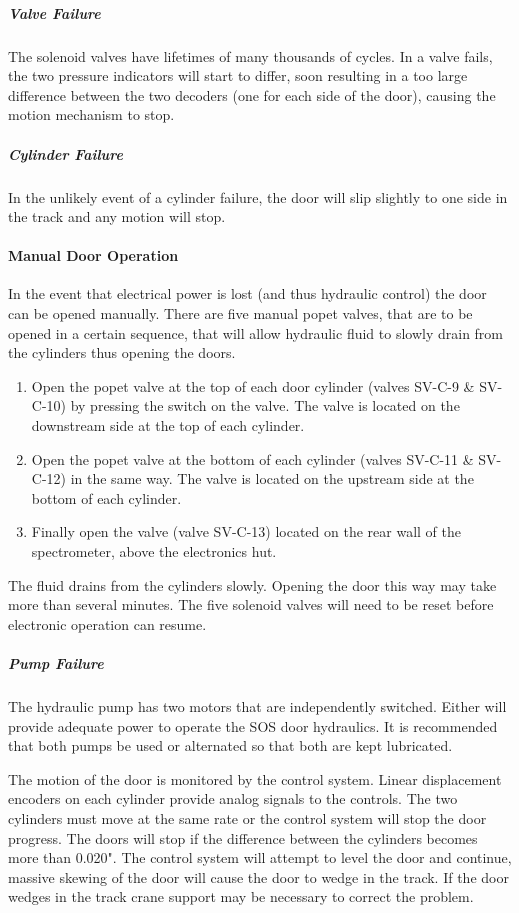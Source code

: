 \subparagraph{Valve Failure}

The solenoid valves have lifetimes of many thousands of cycles.
In a valve fails, the two pressure indicators will start to differ, soon
resulting in a too large difference between the two decoders (one for each
side of the door), causing the motion mechanism to stop.

\subparagraph{Cylinder Failure}

In the unlikely event of a cylinder failure, the door will slip slightly to one
side in the track and any motion will stop.

\paragraph{Manual Door Operation}

In the event that electrical power is lost (and thus hydraulic control) the
door can be opened manually. There are five manual popet valves, that are
to be opened in a certain sequence, that will allow hydraulic fluid to slowly
drain from the cylinders thus opening the doors.

\begin{enumerate}
\item{Open the popet valve at the top of each door cylinder (valves SV-C-9
\& SV-C-10) by
pressing the switch on the valve. The valve is located on the downstream
side at the top of each cylinder.}
\item{Open the popet valve at the bottom of each cylinder (valves SV-C-11
\& SV-C-12) in
the same way. The valve is located on the upstream side at the bottom of
each cylinder.}
\item{Finally open the valve (valve SV-C-13) located on the rear wall of the
spectrometer, above the electronics hut.}
\end{enumerate}

The fluid drains from the cylinders slowly. Opening the door this way may
take more than several minutes. The five solenoid valves will need to be
reset before electronic operation can resume.

\subparagraph{Pump Failure}

The hydraulic pump has two motors that are independently switched.
Either will provide adequate power to operate the SOS door hydraulics. It
is recommended that both pumps be used or alternated so that both are kept
lubricated.

The motion of the door is monitored by the control system. Linear
displacement encoders on each cylinder provide analog signals to the controls.
The two cylinders must move at the same rate or the control system will
stop the door progress. The doors will stop if the difference between the
cylinders becomes more than 0.020". The control system will attempt to
level the door and continue, massive skewing of the door will cause the
door to wedge in the track. If the door wedges in the track crane support
may be necessary to correct the problem.


